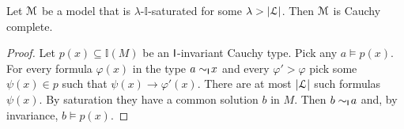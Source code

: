\documentclass[10pt,oneside]{amsproc}
\begin{document}




\begin{fact}
  Let ${\EuScript M}$ be a model that is $\lambda$-$\mathds{I}$-saturated for some $\lambda>|{\EuScript L}|$.
  Then ${\EuScript M}$ is Cauchy complete.
\end{fact}

\begin{proof}  
  Let $p(x)\subseteq\mathds{I}(M)$ be an ${\sf I}$-invariant Cauchy type.
  Pick any $a\models p(x)$.
  For every formula $\varphi(x)$ in the type $a\sim_{\sf I}\!x$ and every $\varphi'>\varphi$ pick some $\psi(x)\in p$ such that $\psi(x)\rightarrow\varphi'(x)$.
  There are at most $|{\EuScript L}|$ such formulas $\psi(x)$.
  By saturation they have a common solution $b$ in $M$.
  Then $b\sim_{\sf I}\!a$ and, by invariance, $b\models p(x)$.
\end{proof}



\end{document}
